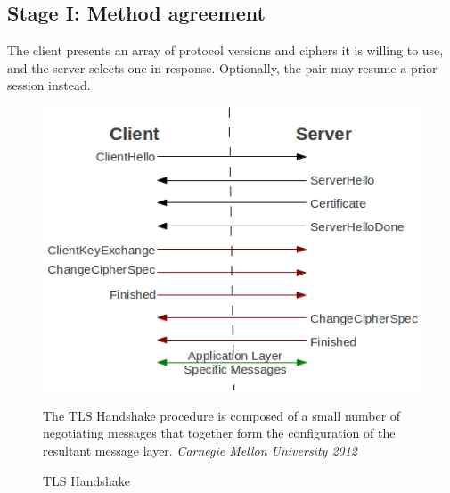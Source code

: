 \documentclass[12pt]{article}
\begin{document}
\subsection{Stage I: Method agreement}

The client presents an array of protocol versions and ciphers it is willing to use, and the server selects one in response. Optionally, the pair may resume a prior session instead.

\begin{figure}[ht]
    \begin{minipage}[c]{0.55\textwidth}
        \includegraphics[width=\textwidth]{tls_protocol.png}
    \end{minipage}
    \begin{minipage}[c]{0.4\textwidth}
        \caption{TLS Handshake}%
        \label{Handshake}%
        \sffamily\footnotesize The TLS Handshake procedure is composed of a small number of negotiating messages that together form the configuration of the resultant message layer.
        \scriptsize\textcopyright\rmfamily\textit{Carnegie Mellon University 2012}
    \end{minipage}
\end{figure}
\end{document}
